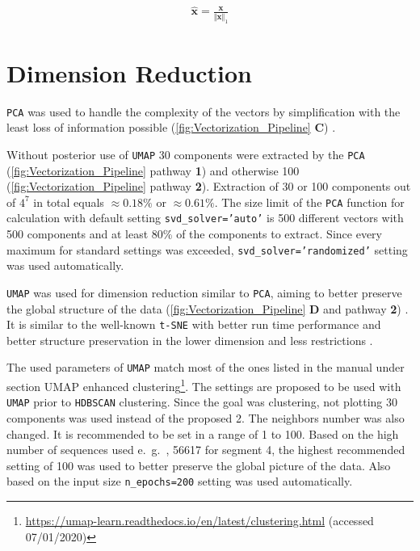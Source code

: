 \begin{equation}\label{eq:norm1}
    \begin{aligned}
        \mathbf{\hat{x}} = \frac{\mathbf{x}}{\Vert\mathbf{x}\Vert_1}
    \end{aligned}
\end{equation}

\section{Dimension Reduction} \label{sec:PCA}

\texttt{PCA} was used to handle the complexity of the vectors by simplification with the least loss of information possible (\autoref{fig:Vectorization_Pipeline} \textsf{\textbf{C}}) \autocite{pearson_liii_1901} \autocite{pedregosa_scikit-learn_2011}.

\vspace{1em}

Without posterior use of \texttt{UMAP} 30 components were extracted by the \texttt{PCA} (\autoref{fig:Vectorization_Pipeline} pathway \textsf{\textbf{1}}) and otherwise 100 (\autoref{fig:Vectorization_Pipeline} pathway \textsf{\textbf{2}}). Extraction of 30 or 100 components out of $4^7$ in total equals $\approx 0.18\%$ or $\approx 0.61\%$. The size limit of the \texttt{PCA} function for calculation with default setting \texttt{svd\_solver='auto'} is 500 different vectors with 500 components and at least 80\% of the components to extract. Since every maximum for standard settings was exceeded, \texttt{svd\_solver='randomized'} setting was used automatically. %

\vspace{1em}

\texttt{UMAP} was used for dimension reduction similar to \texttt{PCA}, aiming to better preserve the global structure of the data (\autoref{fig:Vectorization_Pipeline} \textsf{\textbf{D}} and pathway \textsf{\textbf{2}}) \autocite{mcinnes_umap_2020}. It is similar to the well-known \texttt{t-SNE} with better run time performance and better structure preservation in the lower dimension and less restrictions \autocite{maaten_visualizing_2008, mcinnes_umap_2020}. %

The used parameters of \texttt{UMAP} match most of the ones listed in the manual under section \glqq UMAP enhanced clustering\grqq{}\footnote{\url{https://umap-learn.readthedocs.io/en/latest/clustering.html} (accessed 07/01/2020)}. The settings are proposed to be used with \texttt{UMAP} prior to \texttt{HDBSCAN} clustering. Since the goal was clustering, not plotting 30 components was used instead of the proposed 2. The neighbors number was also changed. It is recommended to be set in a range of 1 to 100. Based on the high number of sequences used e.~g.~, 56617 for segment 4, the highest recommended setting of 100 was used to better preserve the global picture of the data. Also based on the input size \texttt{n\_epochs=200} setting was used automatically.

